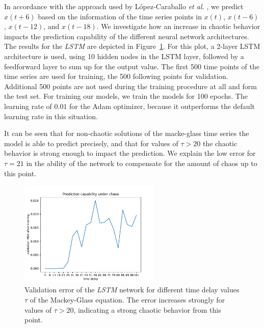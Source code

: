 \documentclass{article}
\begin{document}
In accordance with the approach used by López-Caraballo \textit{et al.}
\cite{lopez2016}, we predict $x(t+6)$ based on the information of the time
series points in $x(t)$, $x(t-6)$, $x(t-12)$, and $x(t-18)$. We investigate how
an increase in chaotic behavior impacts the prediction capability of the
different neural network architectures. The results for the \emph{LSTM}
are depicted in Figure~\ref{fig:mackey_lstm}. For this plot, a 2-layer
LSTM architecture is used, using 10 hidden nodes in the LSTM layer,
followed by a feedforward layer to sum up for the output value.
The first 500 time points of the time series are used for training, the 500
following points for validation. Additional 500 points are not used during the
training procedure at all and form the test set. For training our models, we 
train the models for 100 epochs. The learning rate of $0.01$ for the Adam 
optimizer, because it outperforms the default learning rate in this situation.

It can be seen that for non-chaotic solutions of the macke-glass time series the
model is able to predict precisely, and that for values of $\tau > 20$ the
chaotic behavior is strong enough to impact the prediction. We explain the low
error for $\tau = 21$ in the ability of the network to compensate for the amount
of chaos up to this point.

\begin{figure}
    \centering 
    \includegraphics[width=0.6\textwidth]{figures/mackey_glass_lstm_fast.pdf}
    \caption{Validation error of the \emph{LSTM} network for different
        time delay values $\tau$ of the Mackey-Glass equation. The error increases
        strongly for values of $\tau > 20$, indicating a strong chaotic behavior
        from this point.}
    \label{fig:mackey_lstm}
\end{figure}
\end{document}
